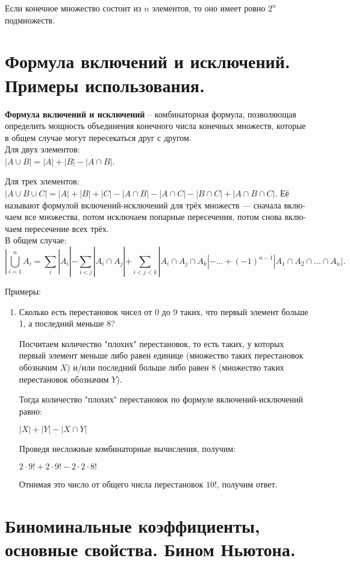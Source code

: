 Если конечное множество состоит из $n$ элементов, то оно имеет ровно $2^n$ подмножеств.\\

\section{Формула включений и исключений. Примеры использования.} 

\textbf{Формула включений и исключений} -- комбинаторная формула, позволяющая определить мощность объединения конечного числа конечных множеств, которые в общем случае могут пересекаться друг с другом.\\
Для двух элементов:\\
$|A \cup B| = |A| + |B| - |A \cap B|$.	

Для трех элементов: \\
$|A \cup B \cup C| = |A| + |B| +|C| - |A \cap B| - |A \cap C| - |B \cap C| + |A \cap B \cap C|$.
Её называют формулой включений-исключений для трёх множеств — сначала вклю-
чаем все множества, потом исключаем попарные пересечения, потом снова вклю-
чаем пересечение всех трёх.\\

В общем случае: 
\[
|\bigcup_{i=1}^{n} A_i = \sum_{i}^{}|A_i| - \sum_{i<j}|A_i \cap A_j| + \sum_{i<j<k}|A_i \cap A_j \cap A_k| - \ldots + (-1)^{n-1}|A_1 \cap A_2 \cap \ldots \cap A_n|.
\]


Примеры:
\begin{enumerate}
	\item Сколько есть перестановок чисел от 0 до 9 таких, что первый элемент больше 1, а последний меньше 8?
	
	Посчитаем количество "плохих" перестановок, то есть таких, у которых первый элемент меньше либо равен единице (множество таких перестановок обозначим $X$) и/или последний больше либо равен 8 (множество таких перестановок обозначим $Y$).
	
	Тогда количество "плохих" перестановок по формуле включений-исключений равно:
	
	$|X|+|Y|-|X \cap Y|$
	
	Проведя несложные комбинаторные вычисления, получим:
	
	$2 \cdot 9!+2 \cdot 9! - 2 \cdot 2 \cdot 8!$
	
	Отнимая это число от общего числа перестановок $10!$, получим ответ. 
\end{enumerate}


\section{Биноминальные коэффициенты, основные свойства. Бином Ньютона.} 




